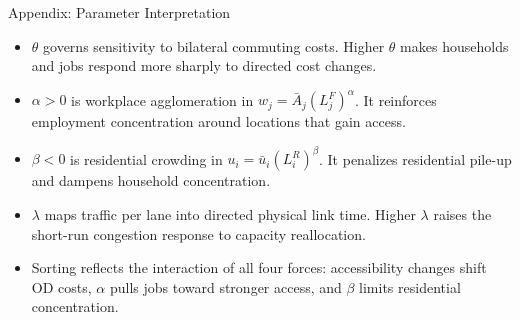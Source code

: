 \documentclass[11pt,aspectratio=169]{beamer}
\newcommand{\navback}[1]{\par\vspace{0.35em}\noindent\hfill\hyperlink{#1}{\beamerreturnbutton{back}}}
\begin{document}
\begin{frame}[label=appparams]{Appendix: Parameter Interpretation}
\begin{itemize}\small
  \item $\theta$ governs sensitivity to bilateral commuting costs. Higher $\theta$ makes households and jobs respond more sharply to directed cost changes.
  \item $\alpha>0$ is workplace agglomeration in $w_j=\bar A_j(L_j^F)^\alpha$. It reinforces employment concentration around locations that gain access.
  \item $\beta<0$ is residential crowding in $u_i=\bar u_i(L_i^R)^\beta$. It penalizes residential pile-up and dampens household concentration.
  \item $\lambda$ maps traffic per lane into directed physical link time. Higher $\lambda$ raises the short-run congestion response to capacity reallocation.
  \item Sorting reflects the interaction of all four forces: accessibility changes shift OD costs, $\alpha$ pulls jobs toward stronger access, and $\beta$ limits residential concentration.
\end{itemize}
\navback{estparams}
\end{frame}
\end{document}
